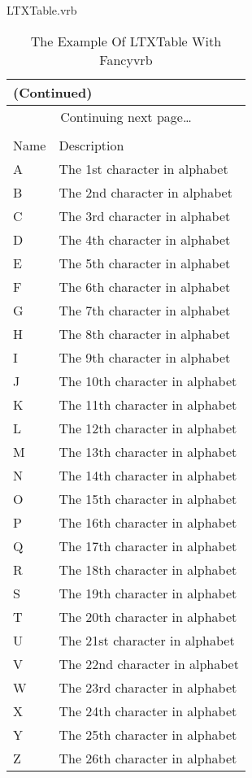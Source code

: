 
\begin{VerbatimOut}{LTXTable.vrb}
    \begin{longtable}{|X|X|}
        \caption{The Example Of LTXTable With Fancyvrb} \\
        \hline
        \endfirsthead
    
        \multicolumn{2}{l}{ (Continued) } \\
        \hline
        \endhead
    
        \multicolumn{2}{c}{Continuing next page\ldots} \\[2ex]
        \endfoot
    
        \hline
        \multicolumn{2}{r}{End Of Table} \\
        \endlastfoot
    
        Name & Description \\ \hline
        A & The 1st character in alphabet \\
        B & The 2nd character in alphabet \\
        C & The 3rd character in alphabet \\
        D & The 4th character in alphabet \\
        E & The 5th character in alphabet \\
        F & The 6th character in alphabet \\
        G & The 7th character in alphabet \\
        H & The 8th character in alphabet \\
        I & The 9th character in alphabet \\
        J & The 10th character in alphabet \\
        K & The 11th character in alphabet \\
        L & The 12th character in alphabet \\
        M & The 13th character in alphabet \\
        N & The 14th character in alphabet \\
        O & The 15th character in alphabet \\
        P & The 16th character in alphabet \\
        Q & The 17th character in alphabet \\
        R & The 18th character in alphabet \\
        S & The 19th character in alphabet \\
        T & The 20th character in alphabet \\
        U & The 21st character in alphabet \\
        V & The 22nd character in alphabet \\
        W & The 23rd character in alphabet \\
        X & The 24th character in alphabet \\
        Y & The 25th character in alphabet \\
        Z & The 26th character in alphabet \\
    \end{longtable}
\end{VerbatimOut}
